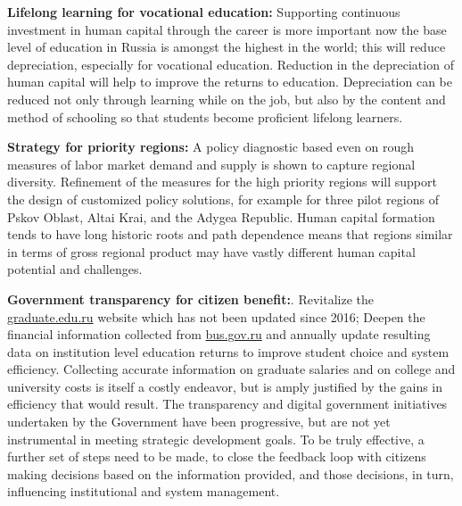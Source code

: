\documentclass[alpha-refs]{wiley-article-04t}
\begin{document}
\hspace{-1.8em} \textbf{Lifelong learning for vocational education:} 
Supporting continuous investment in human capital through the career is 
more important now the base level of education in Russia is amongst the 
highest in the world; this will reduce depreciation, especially for 
vocational education. Reduction in the depreciation of human capital will 
help to improve the returns to education. Depreciation can be reduced not 
only through learning while on the job, but also by the content and method 
of schooling so that students become proficient lifelong learners. 

\vspace{0.4em} 

\hspace{-1.8em} \textbf{Strategy for priority regions:} A policy 
diagnostic based even  on rough measures of labor market demand and supply 
is shown to capture  regional diversity. Refinement of the measures for the
high priority regions will support the design of customized policy 
solutions, for example for three pilot regions of Pskov Oblast, Altai Krai, 
and the Adygea Republic. Human capital formation tends to have long 
historic roots and path dependence means that regions similar in terms of 
gross regional product may have vastly different human capital potential 
and challenges. 

\vspace{0.4em} 

\hspace{-1.8em} \textbf{Government transparency for citizen benefit:}. 
Revitalize the  \href{https:\\graduate.edu.ru}{graduate.edu.ru} website 
which has not  been updated since 2016; Deepen the financial information 
collected from  \href{https:\\bus.gov.ru}{bus.gov.ru} and annually update 
resulting data on  institution level education returns to 
improve student choice and system efficiency. Collecting accurate 
information on graduate salaries and on college and university costs is 
itself a costly endeavor, but is amply justified by the gains in efficiency 
that would result. The transparency and digital government initiatives 
undertaken by the Government have been progressive, but are not yet 
instrumental in meeting strategic development goals. To be truly effective, 
a further set of steps need to be made, to close the feedback loop with 
citizens making decisions based on the information provided, and those 
decisions, in turn, influencing institutional and system management. 

\newpage
\printbibliography
\end{document}
